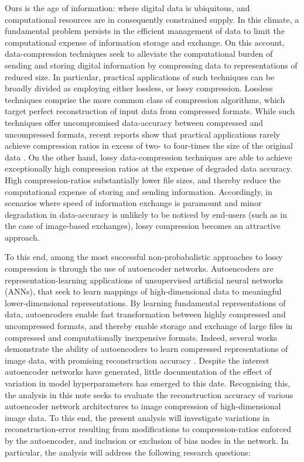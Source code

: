 

\noindent
Ours is the age of information: where digital data is ubiquitous, and computational resources are in consequently constrained supply.
In this climate, a fundamental problem persists in the efficient management of data to limit the computational expense of information storage and exchange.
On this account, data-compression techniques seek to alleviate the computational burden of sending and storing digital information by compressing data to representations of reduced size.
In particular, practical applications of such techniques can be broadly divided as employing either lossless, or lossy compression.
Lossless techniques comprise the more common class of compression algorithms, which target perfect reconstruction of input data from compressed formats.
While such techniques offer uncompromised data-accuracy between compressed and uncompressed formats, recent reports show that practical applications rarely achieve compression ratios in excess of two- to four-times the size of the original data \cite{mittal2015survey}.
On the other hand, lossy data-compression techniques are able to achieve exceptionally high compression ratios at the expense of degraded data accuracy.
High compression-ratios substantially lower file sizes, and thereby reduce the computational expense of storing and sending information. 
Accordingly, in scenarios where speed of information exchange is paramount and minor degradation in data-accuracy is unlikely to be noticed by end-users (such as in the case of image-based exchanges), lossy compression becomes an attractive approach. 

To this end, among the most successful non-probabalistic approaches to lossy compression is through the use of autoencoder networks.
Autoencoders are representation-learning applications of unsupervised artificial neural networks (ANNs), that seek to learn mappings of high-dimensional data to meaningful lower-dimensional representations.
By learning fundamental representations of data, autoencoders enable fast transformation between highly compressed and uncompressed formats, and thereby enable storage and exchange of large files in compressed and computationally inexpensive formats.
Indeed, several works demonstrate the ability of autoencoders to learn compressed representations of image data, with promising reconstruction accuracy \cite{cheng2018deep, toderici2017full, balle2016end}.
Despite the interest autoencoder networks have generated, little  documentation of the effect of variation in model hyperparameters has emerged to this date.
Recognising this, the analysis in this note seeks to evaluate the reconstruction accuracy of various autoencoder network architectures to image compression of high-dimensional image data. 
To this end, the present analysis will investigate variations in reconstruction-error resulting from modifications to compression-ratios enforced by the autoencoder, and inclusion or exclusion of bias nodes in the network. In particular, the analysis will address the following research questions:

